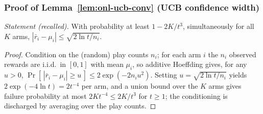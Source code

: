 \subsubsection*{Proof of Lemma~\ref{lem:onl-ucb-conv} (UCB confidence width)}
{\itshape Statement (recalled).} With probability at least $1 - 2K/t^3$,
simultaneously for all $K$ arms,
$|\bar r_i - \mu_i| \le \sqrt{2\ln t / n_i}$.\eop

\begin{proof}
Condition on the (random) play counts $n_i$; for each arm $i$ the $n_i$
observed rewards are i.i.d.\ in $[0,1]$ with mean $\mu_i$, so additive
Hoeffding gives, for any $u > 0$,
$\Pr[\,|\bar r_i - \mu_i| \ge u\,] \le 2\exp(-2n_i u^2)$. Setting
$u = \sqrt{2\ln t / n_i}$ yields $2\exp(-4\ln t) = 2t^{-4}$ per arm, and a
union bound over the $K$ arms gives failure probability at most $2Kt^{-4}
\le 2K/t^3$ for $t \ge 1$; the conditioning is discharged by averaging over
the play counts.
\end{proof}




